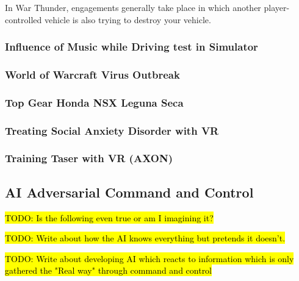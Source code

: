 \documentclass{article}
\begin{document}
In War Thunder, engagements generally take place in which another player-controlled vehicle is also trying to destroy your vehicle.



\subsubsection{Influence of Music while Driving test in Simulator}


\subsubsection{World of Warcraft Virus Outbreak}

\subsubsection{Top Gear Honda NSX Leguna Seca}

\subsubsection{Treating Social Anxiety Disorder with VR}

\subsubsection{Training Taser with VR (AXON)}


\subsection{AI Adversarial Command and Control}

\hl{TODO: Is the following even true or am I imagining it?}

\hl{TODO: Write about how the AI knows everything but pretends it doesn't.}

\hl{TODO: Write about developing AI which reacts to information which is only gathered the "Real way" through command and control}
\end{document}
